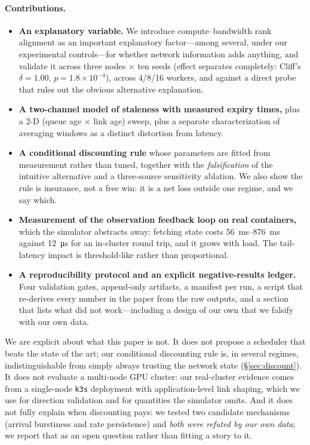 \paragraph{Contributions.}
\begin{itemize}
  \item \textbf{An explanatory variable.} We introduce compute--bandwidth rank alignment as an
        important explanatory factor---among several, under our experimental controls---for
        whether network information adds anything, and validate it across three
        nodes $\times$ ten seeds (effect separates completely: Cliff's $\delta=1.00$,
        $p=1.8\times10^{-4}$), across 4/8/16 workers, and against a direct probe that rules out
        the obvious alternative explanation.
  \item \textbf{A two-channel model of staleness with measured expiry times,} plus a 2-D
        (queue age $\times$ link age) sweep, plus a separate characterization of averaging
        windows as a distinct distortion from latency.
  \item \textbf{A conditional discounting rule} whose parameters are fitted from measurement
        rather than tuned, together with the \emph{falsification} of the intuitive alternative
        and a three-source sensitivity ablation. We also show the rule is insurance, not a
        free win: it is a net loss outside one regime, and we say which.
  \item \textbf{Measurement of the observation feedback loop on real containers,} which the
        simulator abstracts away: fetching state costs \SIrange{56}{876}{\milli\second} against
        \SI{12}{\micro\second} for an in-cluster round trip, and it grows with load. The
        tail-latency impact is threshold-like rather than proportional.
  \item \textbf{A reproducibility protocol and an explicit negative-results ledger.} Four
        validation gates, append-only artifacts, a manifest per run, a script that re-derives
        every number in the paper from the raw outputs, and a section that lists what did not
        work---including a design of our own that we falsify with our own data.
\end{itemize}

We are explicit about what this paper is not. It does not propose a scheduler that beats the
state of the art; our conditional discounting rule is, in several regimes, indistinguishable
from simply always trusting the network state (\S\ref{sec:discount}). It does not evaluate a
multi-node GPU cluster: our real-cluster evidence comes from a single-node \texttt{k3s}
deployment with application-level link shaping, which we use for direction validation and for
quantities the simulator omits. And it does not fully explain when discounting pays: we tested
two candidate mechanisms (arrival burstiness and rate persistence) and \emph{both were refuted
by our own data}; we report that as an open question rather than fitting a story to it.
